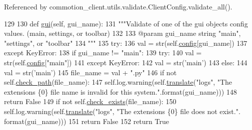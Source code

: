 Referenced by commotion\-\_\-client.\-utils.\-validate.\-Client\-Config.\-validate\-\_\-all().


\begin{DoxyCode}
129 
130     \textcolor{keyword}{def }\hyperlink{classcommotion__client_1_1utils_1_1validate_1_1ClientConfig_aa3a463fc48d9d7d219356d6150b4630f}{gui}(self, gui\_name):
131         \textcolor{stringliteral}{"""Validate of one of the gui objects config values. (main, settings, or toolbar)}
132 \textcolor{stringliteral}{}
133 \textcolor{stringliteral}{        @param gui\_name string "main", "settings", or "toolbar"}
134 \textcolor{stringliteral}{        """}
135         \textcolor{keywordflow}{try}:
136             val = str(self.\hyperlink{classcommotion__client_1_1utils_1_1validate_1_1ClientConfig_acce323dd2fef1e3c2819cd0ed068cb67}{config}[gui\_name])
137         \textcolor{keywordflow}{except} KeyError:
138             \textcolor{keywordflow}{if} gui\_name != \textcolor{stringliteral}{"main"}:
139                 \textcolor{keywordflow}{try}:
140                     val = str(self.\hyperlink{classcommotion__client_1_1utils_1_1validate_1_1ClientConfig_acce323dd2fef1e3c2819cd0ed068cb67}{config}[\textcolor{stringliteral}{"main"}])
141                 \textcolor{keywordflow}{except} KeyError:
142                     val = str(\textcolor{stringliteral}{'main'})
143             \textcolor{keywordflow}{else}:
144                 val = str(\textcolor{stringliteral}{'main'})
145         file\_name = val + \textcolor{stringliteral}{".py"}
146         \textcolor{keywordflow}{if} \textcolor{keywordflow}{not} self.\hyperlink{classcommotion__client_1_1utils_1_1validate_1_1ClientConfig_a3564ac59723769f067537a4ff21aa027}{check\_path}(file\_name):
147             self.log.warning(self.\hyperlink{classcommotion__client_1_1utils_1_1validate_1_1ClientConfig_a12d19377a853ce92cc0e0d758acdd804}{translate}(\textcolor{stringliteral}{"logs"}, \textcolor{stringliteral}{"The extensions \{0\} file name is invalid for
       this system."}.format(gui\_name)))
148             \textcolor{keywordflow}{return} \textcolor{keyword}{False}
149         \textcolor{keywordflow}{if} \textcolor{keywordflow}{not} self.\hyperlink{classcommotion__client_1_1utils_1_1validate_1_1ClientConfig_a8dbef5da5fb270a8842b3eed36bc595e}{check\_exists}(file\_name):
150             self.log.warning(self.\hyperlink{classcommotion__client_1_1utils_1_1validate_1_1ClientConfig_a12d19377a853ce92cc0e0d758acdd804}{translate}(\textcolor{stringliteral}{"logs"}, \textcolor{stringliteral}{"The extensions \{0\} file does not exist."}.
      format(gui\_name)))
151             \textcolor{keywordflow}{return} \textcolor{keyword}{False}
152         \textcolor{keywordflow}{return} \textcolor{keyword}{True}

\end{DoxyCode}
